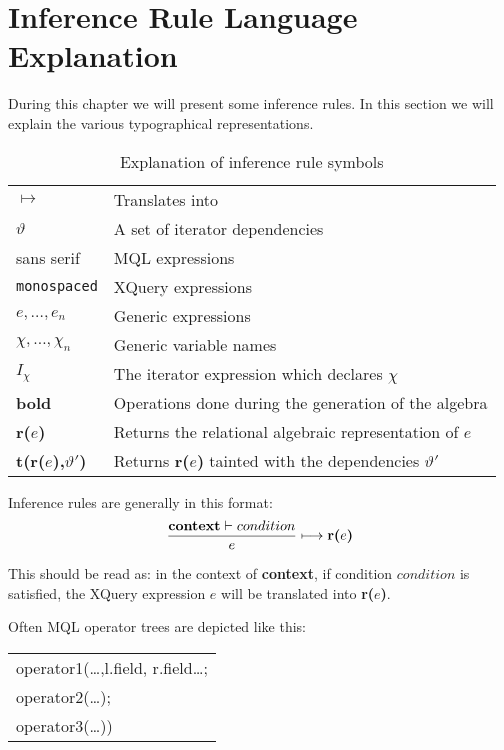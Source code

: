 \section{Inference Rule Language Explanation}
\label{sect:trans:TD:langExpl}
During this chapter we will present some inference rules. In this section we will explain the various
typographical representations.

\begin{table}[h]
\centering
\begin{tabular}{l|l}

  $\longmapsto$  			& Translates into \\
  $\vartheta$ 				& A set of iterator dependencies \\
  \textsf{sans serif} 		& MQL expressions \\
  \texttt{monospaced} 		& XQuery expressions \\
  $e,\ldots,e_{n}$			& Generic expressions \\
  $\chi,\ldots,\chi_{n}$	& Generic variable names \\
  $I_{\chi}$				& The iterator expression which declares $\chi$ \\
  \textbf{bold} 			& Operations done during the generation of the algebra \\
  \textbf{r(}$e$\textbf{)} 	& Returns the relational algebraic representation of $e$   \\
  \textbf{t(}\textbf{r(}$e$\textbf{)}\textbf{,}$\vartheta'$\textbf{)} & Returns \textbf{r(}$e$\textbf{)} tainted
  with the dependencies $\vartheta'$ \\
  
\end{tabular}
\caption{Explanation of inference rule symbols}
\label{tab:trans:td:langExpl}
\end{table}

Inference rules are generally in this format:
\begin{equation*}
\frac{\mbox{\textbf{context}}\vdash condition}{e}\longmapsto \mbox{\textbf{r(}}e\mbox{\textbf{)}}
\end{equation*}

This should be read as: in the context of \textbf{context}, if condition $condition$ is satisfied, the XQuery
expression $e$ will be translated into \textbf{r(}$e$\textbf{)}.

Often MQL operator trees are depicted like this:
\begin{center}
\begin{tabular}{l}
\textsf{operator1(\ldots,l.field, r.field\ldots; } \\ \quad
\textsf{operator2(\ldots);} \\ \quad
\textsf{operator3(\ldots))}
\end{tabular}
\end{center}

